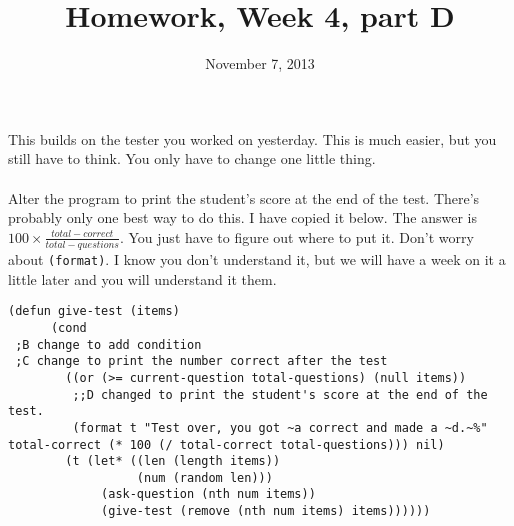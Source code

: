 \documentclass{article}
\title{Homework, Week 4, part D}
\date{November 7, 2013}
\begin{document}
\maketitle{}

\paragraph{}This builds on the tester you worked on yesterday. This is much easier, but you still have to think. You only have to change one little thing.

\paragraph{}Alter the program to print the student's score at the end of the test. There's probably only one best way to do this. I have copied it below. The answer is $100 \times \frac{total-correct}{total-questions}$. You just have to figure out where to put it. Don't worry about \texttt{(format)}. I know you don't understand it, but we will have a week on it a little later and you will understand it them.

\lstset{language=Lisp,numbers=left,keepspaces=false,basicstyle=\small,numberstyle=\tiny,breaklines=true,showstringspaces=false}
\begin{lstlisting}
(defun give-test (items)
      (cond
 ;B change to add condition
 ;C change to print the number correct after the test
        ((or (>= current-question total-questions) (null items)) 
         ;;D changed to print the student's score at the end of the test.
         (format t "Test over, you got ~a correct and made a ~d.~%" total-correct (* 100 (/ total-correct total-questions))) nil)
        (t (let* ((len (length items))
                  (num (random len)))
             (ask-question (nth num items))
             (give-test (remove (nth num items) items))))))
\end{lstlisting}
\end{document}
